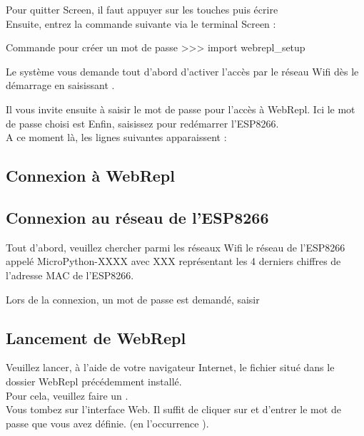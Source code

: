 

Pour quitter Screen, il faut appuyer sur les touches  puis écrire  \\

Ensuite, entrez la commande suivante via le terminal Screen :
\begin{Bash}{Commande pour créer un mot de passe}
>>> import webrepl_setup
\end{Bash}

Le système vous demande tout d'abord d’activer l’accès par le réseau Wifi dès le démarrage en saisissant .


Il vous invite ensuite à saisir le mot de passe pour l'accès à WebRepl. Ici le mot de passe choisi est 
Enfin, saisissez  pour redémarrer l'ESP8266.\\
A ce moment là, les lignes suivantes apparaissent : 



\subsection{Connexion à WebRepl}



\subsection{Connexion au réseau de l'ESP8266}

Tout d'abord, veuillez chercher parmi les réseaux Wifi le réseau de l'ESP8266 appelé MicroPython-XXXX avec XXX représentant les 4 derniers chiffres de l'adresse MAC de l'ESP8266.

Lors de la connexion, un mot de passe est demandé, saisir 

\subsection{Lancement de WebRepl}

 Veuillez lancer, à l'aide de votre navigateur Internet, le fichier   situé dans le dossier WebRepl précédemment installé. \\
 Pour cela, veuillez faire un . \\
Vous tombez sur l’interface Web. Il suffit de cliquer sur  et d’entrer le mot de passe que vous avez définie.
(en l'occurrence ).


